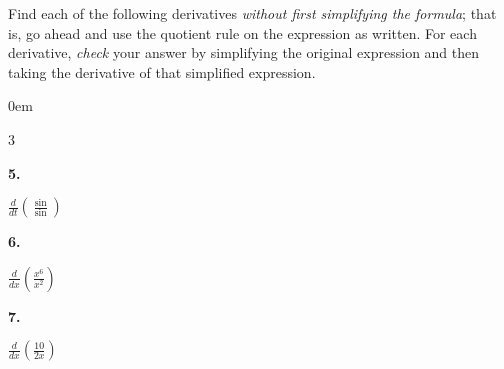 \documentclass[12pt,]{book}
\theoremstyle{plain}
\theoremstyle{definition}
\numberwithin{equation}{section}
\newenvironment{exercisegroup}%
{\medskip\noindent}%
{\par\bigskip}%
\newlength{\exercisegroupindent}%
\newlength{\exercisegroupitemwidth}%
\newenvironment{exercisegrouplist}%
{\vspace{-\partopsep}%
\begin{adjustwidth}{\exercisegroupindent}{0em}}%
{\end{adjustwidth}%
\vspace{-\partopsep}%
\vspace{\baselineskip}}%
\newenvironment{exercisegroupbycol}[1]%
{\begin{exercisegrouplist}%
\vspace{-\multicolsep}%
\begin{multicols}{#1}%
\setlength{\parindent}{0em}%
\setlength{\exercisegroupitemwidth}{\linewidth}}%
{\end{multicols}%
\vspace{-\multicolsep}%
\end{exercisegrouplist}}%
\newenvironment{exercisegroupitem}[1]%
{\begin{minipage}[t]{\exercisegroupitemwidth}
\vspace{0pt}%
{\bfseries#1}%
\rule{0pt}{\baselineskip}}{\strut%
\end{minipage}%
\hspace{\columnsep}}%
\providecommand\phantomsection{}
\newcommand{\fe}[2]{\mathop{{#1}{\left(#2\right)}}}
\newcommand{\lzoo}[2]{{\frac{d}{d#1}}{\left(#2\right)}}
\begin{document}
\begin{exercisegroup}%
Find each of the following derivatives \emph{without first simplifying the formula}; that is, go ahead and use the quotient rule on the expression as written. For each derivative, \emph{check} your answer by simplifying the original expression and then taking the derivative of that simplified expression.%
\par
\begin{exercisegroupbycol}{3}%
\begin{exercisegroupitem}{5. }\phantomsection\hypertarget{unsimplified-quotient-first}{\null}
\(\lzoo{t}{\frac{\fe{\sin}{t}}{\fe{\sin}{t}}}\)%
\end{exercisegroupitem}%
\par%
\begin{exercisegroupitem}{6. }\phantomsection\hypertarget{exercise-319}{\null}
\(\lzoo{x}{\frac{x^6}{x^2}}\)%
\end{exercisegroupitem}%
\par%
\begin{exercisegroupitem}{7. }\phantomsection\hypertarget{unsimplified-quotient-last}{\null}
\(\lzoo{x}{\frac{10}{2x}}\)%
\end{exercisegroupitem}%
\par%
\end{exercisegroupbycol}%
\end{exercisegroup}%
\typeout{************************************************}
\typeout{************************************************}
\end{document}
